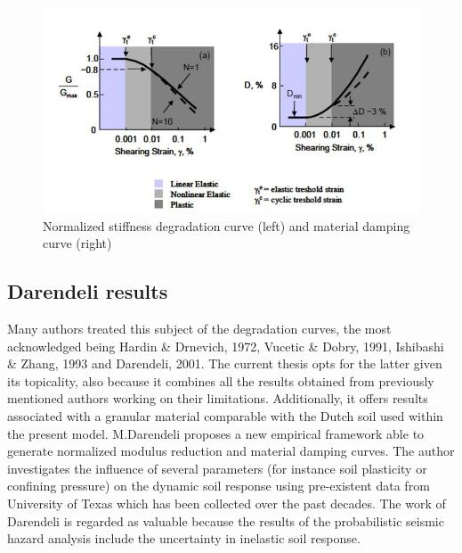 \documentclass[12pt,a4paper]{report}
\begin{document}
\begin{figure}[h!]
	\centering
	\includegraphics[width=0.8\linewidth]{"normalized"}
	\caption{Normalized stiffness degradation curve (left) and material damping curve (right)}
	\label{normalized}
\end{figure}

\subsection{Darendeli results}
Many authors treated this subject of the degradation curves, the most acknowledged being Hardin \& Drnevich, 1972, Vucetic \& Dobry, 1991\cite{dobry1988dynamic}, Ishibashi \& Zhang, 1993 \cite{ishibashi1993unified} and Darendeli, 2001\cite{darendeli2001development}. The current thesis opts for the latter given its topicality, also because it combines all the results obtained from previously mentioned authors working on their limitations. Additionally, it offers results associated with a granular material comparable with the Dutch soil used within the present model.
M.Darendeli proposes a new empirical framework able to generate normalized modulus reduction and material damping curves. The author investigates the influence of several parameters (for instance soil plasticity or confining pressure) on the dynamic soil response using pre-existent data from University of Texas which has been collected over the past decades. The work of Darendeli is regarded as valuable because the results of the probabilistic seismic hazard analysis include the uncertainty in inelastic soil response.
 
\end{document}
